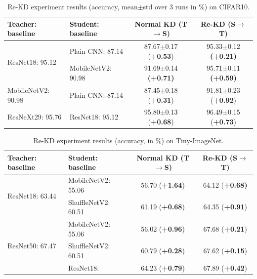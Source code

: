\documentclass[10pt,twocolumn,letterpaper]{article}
\begin{document}
\begin{table}[!h]
\centering
\renewcommand\arraystretch{1.0}
\small
\caption{Re-KD experiment results (accuracy, mean$\pm$std over 3 runs in \%) on CIFAR10.}
\label{tab: Re-KD_cifar10}
\begin{tabular}{l|l|c|c}
\toprule
 Teacher: baseline & Student: baseline   & Normal KD (T$\rightarrow$S) & Re-KD (S$\rightarrow$T) \\ \midrule
\multirow{2}{*}{ResNet18: 95.12} & Plain CNN: 87.14 & 87.67$\pm$0.17 (\textbf{+0.53}) & 95.33$\pm$0.12 \textbf{(+0.21)} \\ %
                          & MobileNetV2: 90.98  &91.69$\pm$0.14 \textbf{(+0.71)} & 95.71$\pm$0.11 \textbf{(+0.59)}         \\ \midrule
                           MobileNetV2: 90.98 & Plain CNN: 87.14 &87.45$\pm$0.18 (\textbf{+0.31}) & 91.81$\pm$0.23 (\textbf{+0.92})   \\ \midrule
                         ResNeXt29: 95.76 & ResNet18: 95.12    &95.80$\pm$0.13 (\textbf{+0.68}) & 96.49$\pm$0.15 (\textbf{+0.73})    \\ \bottomrule
\end{tabular}
\vspace{-5pt}
\end{table}

\begin{table}[!h]
\centering
\renewcommand\arraystretch{1.0}
\small
\caption{Re-KD experiment results (accuracy, in $\%$) on Tiny-ImageNet.}
\label{tab:Re-KD_tiny}
\begin{tabular}{l|l|c|c}
\toprule
Teacher: baseline & Student: baseline & Normal KD (T$\rightarrow$S)  & Re-KD (S$\rightarrow$T)   \\ \midrule
\multirow{2}{*}{ResNet18: 63.44} & MobileNetV2: 55.06 & 56.70 (\textbf{+1.64}) & 64.12 (\textbf{+0.68)} \\ %
            & ShuffleNetV2: 60.51  &61.19 (\textbf{+0.68}) &64.35 (\textbf{+0.91})\\ \midrule
\multirow{3}{*}{ResNet50: 67.47} & MobileNetV2: 55.06 &56.02 (\textbf{+0.96}) & 67.68 (\textbf{+0.21}) \\ %
            & ShuffleNetV2: 60.51 & 60.79 (\textbf{+0.28}) &67.62 (\textbf{+0.15}) \\ %
             & ResNet18:\qquad63.44  & 64.23 (\textbf{+0.79}) & 67.89 (\textbf{+0.42}) \\  \bottomrule
\end{tabular}
\label{-10pt}
\end{table}
\end{document}
